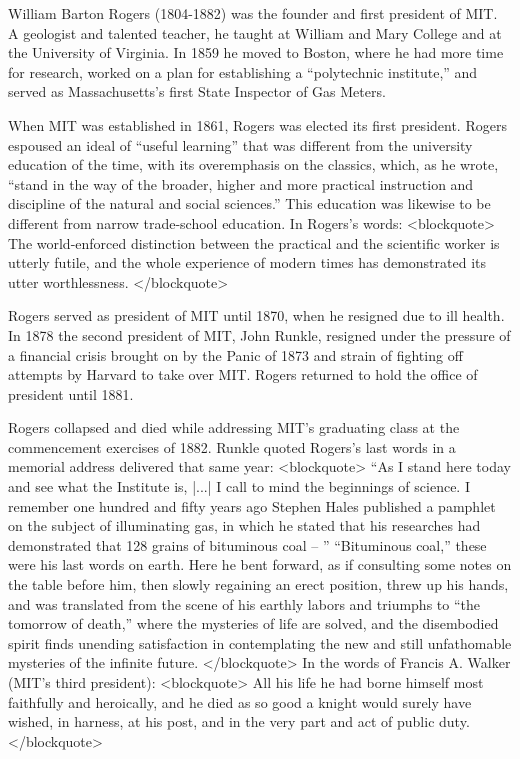\begin{Exercise}
\begin{Exercise}
\begin{Exercise}
\begin{Exercise}
\begin{Exercise}
\begin{Exercise}
\begin{Exercise}
\begin{Exercise}
\begin{Exercise}
\begin{Exercise}
\begin{Exercise}
\begin{Exercise}
William Barton Rogers (1804-1882) was the founder and first president
of MIT.  A geologist and talented teacher, he taught at William and
Mary College and at the University of Virginia.  In 1859 he moved to
Boston, where he had more time for research, worked on a plan
for establishing a ``polytechnic institute,'' and served as
Massachusetts's first State Inspector of Gas Meters.

When MIT was established in 1861, Rogers was elected its first
president.  Rogers espoused an ideal of ``useful learning'' that was
different from the university education of the time, with its
overemphasis on the classics, which, as he wrote, ``stand in the way of
the broader, higher and more practical instruction and discipline of
the natural and social sciences.''  This education was likewise to be
different from narrow trade-school education.  In Rogers's words:
<blockquote>
The world-enforced distinction between the practical and the
scientific worker is utterly futile, and the whole experience of
modern times has demonstrated its utter worthlessness.
</blockquote>

Rogers served as president of MIT until 1870, when he resigned due to
ill health.  In 1878 the second president of MIT, John Runkle,
resigned under the pressure of a financial crisis brought on by the
Panic of 1873 and strain of fighting off attempts by Harvard to take
over MIT.  Rogers returned to hold the office of president until
1881.

Rogers collapsed and died while addressing MIT's graduating class at
the commencement exercises of 1882.  Runkle quoted Rogers's last
words in a memorial address delivered that same year:
<blockquote>
``As I stand here today and see what the Institute is, \scheme|...| I call
to mind the beginnings of science.  I remember one hundred and fifty
years ago Stephen Hales published a pamphlet on the subject of
illuminating gas, in which he stated that his researches had
demonstrated that 128 grains of bituminous coal -- ''
``Bituminous coal,'' these were his last words on earth.  Here he bent
forward, as if consulting some notes on the table before him, then
slowly regaining an erect position, threw up his hands, and was
translated from the scene of his earthly labors and triumphs to ``the
tomorrow of death,'' where the mysteries of life are solved, and the
disembodied spirit finds unending satisfaction in contemplating the
new and still unfathomable mysteries of the infinite future.
</blockquote>
In the words of  Francis A. Walker
(MIT's third president):
<blockquote>
All his life he had borne himself most faithfully and heroically, and
he died as so good a knight would surely have wished, in harness, at
his post, and in the very part and act of public duty.
</blockquote>


\end{Exercise}
\end{Exercise}
\end{Exercise}
\end{Exercise}
\end{Exercise}
\end{Exercise}
\end{Exercise}
\end{Exercise}
\end{Exercise}
\end{Exercise}
\end{Exercise}
\end{Exercise}
